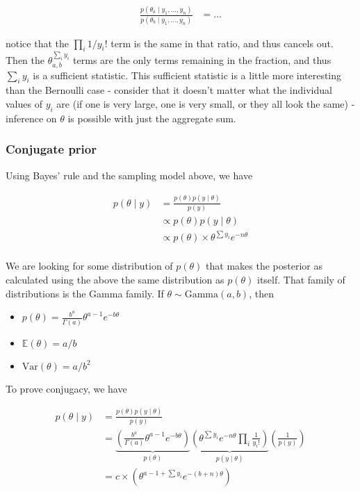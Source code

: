 \documentclass[]{article}
\providecommand{\tightlist}{%
  \setlength{\itemsep}{0pt}\setlength{\parskip}{0pt}}
\begin{document}
\begin{align}
\frac{p(\theta_a \mid y_1, \dots, y_n)}{p(\theta_b \mid y_1, \dots, y_n)} &= \dots
\end{align}

notice that the \(\prod_i 1 / y_i !\) term is the same in that ratio,
and thus cancels out. Then the \(\theta_{a, b}^{\sum_i y_i}\) terms are
the only terms remaining in the fraction, and thus \(\sum_i y_i\) is a
sufficient statistic. This sufficient statistic is a little more
interesting than the Bernoulli case - consider that it doesn't matter
what the individual values of \(y_i\) are (if one is very large, one is
very small, or they all look the same) - inference on \(\theta\) is
possible with just the aggregate sum.

\hypertarget{conjugate-prior}{%
\subsubsection{Conjugate prior}\label{conjugate-prior}}

Using Bayes' rule and the sampling model above, we have

\begin{align}
p(\theta \mid y) &= \frac{p(\theta)p(y \mid \theta)}{p(y)} \\
&\propto p(\theta) p(y \mid \theta) \\
&\propto p(\theta) \times \theta^{\sum y_i} e^{-n\theta} \\
\end{align}

We are looking for some distribution of \(p(\theta)\) that makes the
posterior as calculated using the above the same distribution as
\(p(\theta)\) itself. That family of distributions is the Gamma family.
If \(\theta \sim \text{Gamma}(a, b)\), then

\begin{itemize}
\tightlist
\item
  \(p(\theta) = \frac{b^a}{\Gamma(a)}\theta^{a - 1} e^{-b \theta}\)
\item
  \(\mathbb{E}(\theta) = a/b\)
\item
  \(\text{Var}(\theta) = a/b^2\)
\end{itemize}

To prove conjugacy, we have

\begin{align}
p(\theta \mid y) &= \frac{p(\theta) p(y \mid \theta)}{p(y)} \\
&= \underbrace{\left( \frac{b^a}{\Gamma(a)} \theta^{a - 1} e^{-b \theta}
\right)}_{p(\theta)} \underbrace{\left( \theta^{\sum y_i} e^{-n \theta} \prod_i
\frac{1}{y_i !} \right)}_{p(y \mid \theta)} \left( \frac{1}{p(y)} \right) \\
&= c \times \left( \theta^{a - 1 + \sum y_i} e^{-(b + n) \theta} \right)
\end{align}
\end{document}
